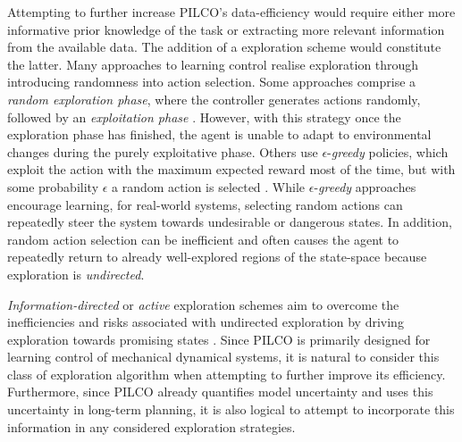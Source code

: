 Attempting to further increase PILCO's data-efficiency would require either more informative prior knowledge of the task or extracting more relevant information from the available data. The addition of a exploration scheme would constitute the latter. Many approaches to learning control realise exploration through introducing randomness into action selection. Some approaches comprise a \textit{random exploration phase}, where the controller generates actions randomly, followed by an \textit{exploitation phase}  \citep{thrun1992active}. However, with this strategy once the exploration phase has finished, the agent is unable to adapt to environmental changes during the purely exploitative phase. Others use $\epsilon$-\textit{greedy} policies, which exploit the action with the maximum expected reward most of the time, but with some probability $\epsilon$ a random action is selected \citep{sutton2018reinforcement}. While $\epsilon$-\textit{greedy} approaches encourage learning, for real-world systems, selecting random actions can repeatedly steer the system towards undesirable or dangerous states. In addition, random action selection can be inefficient and often causes the agent to repeatedly return to already well-explored regions of the state-space because exploration is \textit{undirected}.

\textit{Information-directed} or \textit{active} exploration schemes aim to overcome the inefficiencies and risks associated with undirected exploration by driving exploration towards promising states \citep{zhaohan2019directed}. Since PILCO is primarily designed for learning control of mechanical dynamical systems, it is natural to consider this class of exploration algorithm when attempting to further improve its efficiency. Furthermore, since PILCO already quantifies model uncertainty and uses this uncertainty in long-term planning, it is also logical to attempt to incorporate this information in any considered exploration strategies. 

